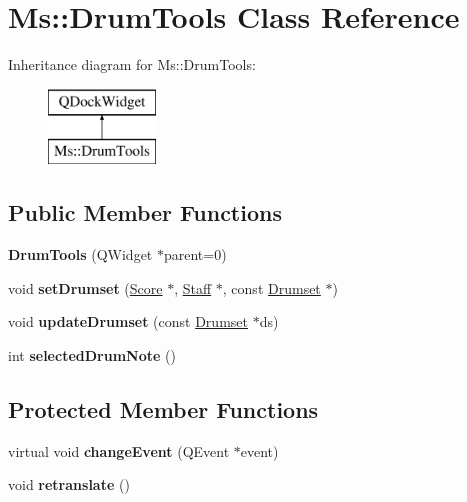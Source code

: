 \hypertarget{class_ms_1_1_drum_tools}{}\section{Ms\+:\+:Drum\+Tools Class Reference}
\label{class_ms_1_1_drum_tools}
Inheritance diagram for Ms\+:\+:Drum\+Tools\+:\begin{figure}[H]
\begin{center}
\leavevmode
\includegraphics[height=2.000000cm]{class_ms_1_1_drum_tools}
\end{center}
\end{figure}
\subsection*{Public Member Functions}
\begin{DoxyCompactItemize}
\item 
\mbox{\label{class_ms_1_1_drum_tools_a221742777e3ba5a9f95a688e40754d0c}} 
{\bfseries Drum\+Tools} (Q\+Widget $\ast$parent=0)
\item 
\mbox{\label{class_ms_1_1_drum_tools_ac2428992ab3d37c2d2b23597e659e8ba}} 
void {\bfseries set\+Drumset} (\hyperlink{class_ms_1_1_score}{Score} $\ast$, \hyperlink{class_ms_1_1_staff}{Staff} $\ast$, const \hyperlink{class_ms_1_1_drumset}{Drumset} $\ast$)
\item 
\mbox{\label{class_ms_1_1_drum_tools_a2a68c6b9511771f24253ecd90b39a0f4}} 
void {\bfseries update\+Drumset} (const \hyperlink{class_ms_1_1_drumset}{Drumset} $\ast$ds)
\item 
\mbox{\label{class_ms_1_1_drum_tools_ada22047583f0af41100ec22692aaea03}} 
int {\bfseries selected\+Drum\+Note} ()
\end{DoxyCompactItemize}
\subsection*{Protected Member Functions}
\begin{DoxyCompactItemize}
\item 
\mbox{\label{class_ms_1_1_drum_tools_a930fb53e56062e58a3d12dd8f33403a1}} 
virtual void {\bfseries change\+Event} (Q\+Event $\ast$event)
\item 
\mbox{\label{class_ms_1_1_drum_tools_ad9c042a975cbd5977adef6db114a80e3}} 
void {\bfseries retranslate} ()
\end{DoxyCompactItemize}


